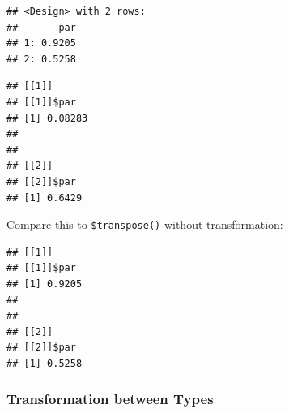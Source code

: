 \documentclass[
]{scrbook}
\newenvironment{Shaded}{\begin{snugshade}}{\end{snugshade}}
\newcommand{\AttributeTok}[1]{\textcolor[rgb]{0.77,0.63,0.00}{#1}}
\newcommand{\CommentTok}[1]{\textcolor[rgb]{0.56,0.35,0.01}{\textit{#1}}}
\newcommand{\ConstantTok}[1]{\textcolor[rgb]{0.00,0.00,0.00}{#1}}
\newcommand{\ControlFlowTok}[1]{\textcolor[rgb]{0.13,0.29,0.53}{\textbf{#1}}}
\newcommand{\DecValTok}[1]{\textcolor[rgb]{0.00,0.00,0.81}{#1}}
\newcommand{\FunctionTok}[1]{\textcolor[rgb]{0.00,0.00,0.00}{#1}}
\newcommand{\NormalTok}[1]{#1}
\newcommand{\OtherTok}[1]{\textcolor[rgb]{0.56,0.35,0.01}{#1}}
\newcommand{\SpecialCharTok}[1]{\textcolor[rgb]{0.00,0.00,0.00}{#1}}
\newcommand{\StringTok}[1]{\textcolor[rgb]{0.31,0.60,0.02}{#1}}
\renewenvironment{Shaded} {\begin{snugshade}\small} {\end{snugshade}}
\begin{document}
\begin{Shaded}
\end{Shaded}

\begin{verbatim}
## <Design> with 2 rows:
##       par
## 1: 0.9205
## 2: 0.5258
\end{verbatim}

\begin{Shaded}
\end{Shaded}

\begin{verbatim}
## [[1]]
## [[1]]$par
## [1] 0.08283
## 
## 
## [[2]]
## [[2]]$par
## [1] 0.6429
\end{verbatim}

Compare this to \texttt{\$transpose()} without transformation:

\begin{Shaded}
\end{Shaded}

\begin{verbatim}
## [[1]]
## [[1]]$par
## [1] 0.9205
## 
## 
## [[2]]
## [[2]]$par
## [1] 0.5258
\end{verbatim}

\hypertarget{transformation-between-types}{%
\subsubsection{Transformation between Types}\label{transformation-between-types}}
\end{document}
